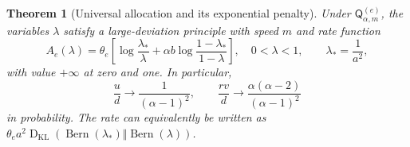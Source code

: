 \documentclass[11pt,a4paper]{article}
\numberwithin{equation}{section}
\newtheorem{theorem}{Theorem}[section]
\theoremstyle{definition}\newaliascnt{definition}{theorem}
\theoremstyle{remark}\newaliascnt{remark}{theorem}
\newcommand{\KL}{\operatorname{D}_{\mathrm{KL}}}
\begin{document}
\begin{theorem}[Universal allocation and its exponential penalty]
\label{thm:allocation-LDP}
Under $\mathsf Q_{\alpha,m}^{(e)}$, the variables $\lambda$ satisfy a
large-deviation principle with speed $m$ and rate function
\begin{equation}
 A_e(\lambda)=\theta_e\left[
   \log\frac{\lambda_*}{\lambda}
   +\alpha b\log\frac{1-\lambda_*}{1-\lambda}\right],
 \quad 0<\lambda<1,\qquad \lambda_*=\frac1{a^2},
 \label{eq:allocation-rate}
\end{equation}
with value $+\infty$ at zero and one. In particular,
\begin{equation}
 \frac{u}{d}\longrightarrow\frac1{(\alpha-1)^2},\qquad
 \frac{rv}{d}\longrightarrow\frac{\alpha(\alpha-2)}{(\alpha-1)^2}
 \label{eq:allocation-limits}
\end{equation}
in probability. The rate can equivalently be written as
$\theta_ea^2\KL(\operatorname{Bern}(\lambda_*)\Vert
\operatorname{Bern}(\lambda))$.
\end{theorem}
\end{document}
